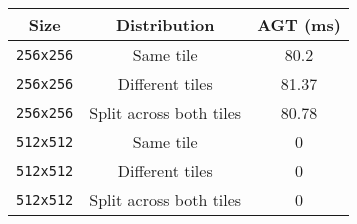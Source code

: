 {\footnotesize
\begin{tabular}{|c|c|c|}
    \hline Size & Distribution & AGT (ms) \\
    \hline \verb|256x256| & Same tile & 80.2 \\
    \verb|256x256| & Different tiles & 81.37 \\
    \verb|256x256| & Split across both tiles & 80.78 \\
    \hline \verb|512x512| & Same tile & 0 \\
    \verb|512x512| & Different tiles & 0 \\
    \verb|512x512| & Split across both tiles & 0 \\
    \hline
\end{tabular}}